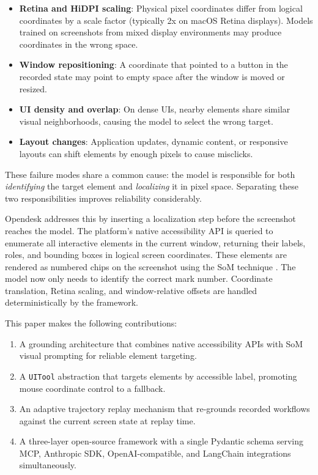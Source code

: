 \documentclass[11pt]{article}
\begin{document}
\begin{itemize}
    \item \textbf{Retina and HiDPI scaling}: Physical pixel coordinates differ from logical coordinates by a scale factor (typically 2x on macOS Retina displays). Models trained on screenshots from mixed display environments may produce coordinates in the wrong space.
    \item \textbf{Window repositioning}: A coordinate that pointed to a button in the recorded state may point to empty space after the window is moved or resized.
    \item \textbf{UI density and overlap}: On dense UIs, nearby elements share similar visual neighborhoods, causing the model to select the wrong target.
    \item \textbf{Layout changes}: Application updates, dynamic content, or responsive layouts can shift elements by enough pixels to cause misclicks.
\end{itemize}

These failure modes share a common cause: the model is responsible for both \emph{identifying} the target element and \emph{localizing} it in pixel space. Separating these two responsibilities improves reliability considerably.

Opendesk addresses this by inserting a localization step before the screenshot reaches the model. The platform's native accessibility API is queried to enumerate all interactive elements in the current window, returning their labels, roles, and bounding boxes in logical screen coordinates. These elements are rendered as numbered chips on the screenshot using the SoM technique \cite{yang2023som}. The model now only needs to identify the correct mark number. Coordinate translation, Retina scaling, and window-relative offsets are handled deterministically by the framework.

This paper makes the following contributions:

\begin{enumerate}
    \item A grounding architecture that combines native accessibility APIs with SoM visual prompting for reliable element targeting.
    \item A \texttt{UITool} abstraction that targets elements by accessible label, promoting mouse coordinate control to a fallback.
    \item An adaptive trajectory replay mechanism that re-grounds recorded workflows against the current screen state at replay time.
    \item A three-layer open-source framework with a single Pydantic schema serving MCP, Anthropic SDK, OpenAI-compatible, and LangChain integrations simultaneously.
\end{enumerate}
\end{document}
